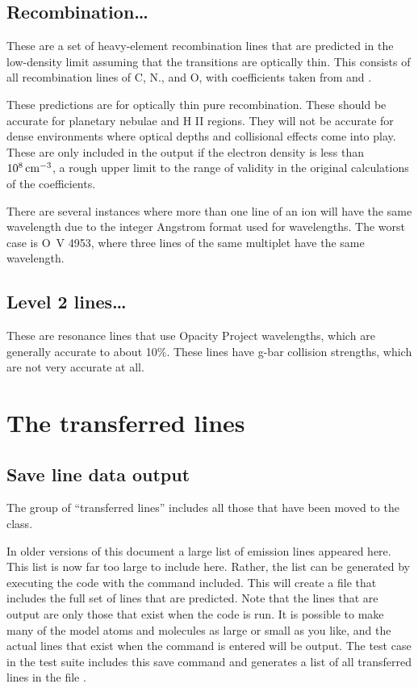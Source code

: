 \subsection{Recombination\dots}

These are a set of heavy-element recombination lines that are predicted
in the low-density limit assuming that the transitions are optically thin.
This consists of all recombination lines of C, N., and O, with coefficients
taken from \citet{Nussbaumer1984} and \citet{Pequignot1991}.

These predictions are for optically thin pure recombination.
These should
be accurate for planetary nebulae and H II regions.
They will not be
accurate for dense environments where optical depths and collisional effects
come into play.
These are only included in the output if the electron
density is less than $10^8 {\rm\thinspace cm^{-3}}$,
a rough upper limit to the range of validity
in the original calculations of the coefficients.

There are several instances where more than one line of an ion will have
the same wavelength due to the integer Angstrom format used for wavelengths.
The worst case is O~V 4953,
where three lines of the same multiplet have
the same wavelength.

\subsection{Level 2 lines\dots }

These are resonance lines that use Opacity Project wavelengths, which
are generally accurate to about 10\%.
These lines have g-bar collision
strengths, which are not very accurate at all.

\section{The transferred lines}
\label{sec:TransferredLines}

\subsection{Save line data output}

The group of ``transferred lines'' includes all those that have been
moved to the  class.

In older versions of this document a large list of emission lines
appeared here.
This list is now far too large to include here.
Rather,
the list can be generated by executing the code with the command  included.
This will create a file that includes the
full set of lines that are predicted.
Note that the lines that are output
are only those that exist when the code is run.
It is possible to make
many of the model atoms and molecules as large or small as you like,
and
the actual lines that exist when the  command
is entered will be output.
The test case  in the test suite
includes this save command and generates a list of all transferred
lines in the file .

